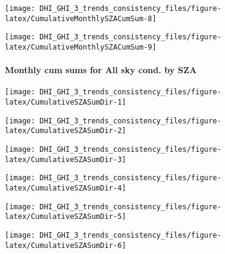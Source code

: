 \documentclass[
  10pt,
  a4paper,oneside]{article}
\begin{document}
\begin{center}\texttt{[image: DHI\_GHI\_3\_trends\_consistency\_files/figure-latex/CumulativeMonthlySZACumSum-8]} \end{center}

\begin{center}\texttt{[image: DHI\_GHI\_3\_trends\_consistency\_files/figure-latex/CumulativeMonthlySZACumSum-9]} \end{center}

\newpage

\FloatBarrier

\hypertarget{monthly-cum-sums-for-all-sky-cond.-by-sza-1}{%
\paragraph{Monthly cum sums for All sky cond. by SZA}\label{monthly-cum-sums-for-all-sky-cond.-by-sza-1}}

\begin{center}\texttt{[image: DHI\_GHI\_3\_trends\_consistency\_files/figure-latex/CumulativeSZASumDir-1]} \end{center}

\begin{center}\texttt{[image: DHI\_GHI\_3\_trends\_consistency\_files/figure-latex/CumulativeSZASumDir-2]} \end{center}

\begin{center}\texttt{[image: DHI\_GHI\_3\_trends\_consistency\_files/figure-latex/CumulativeSZASumDir-3]} \end{center}

\begin{center}\texttt{[image: DHI\_GHI\_3\_trends\_consistency\_files/figure-latex/CumulativeSZASumDir-4]} \end{center}

\begin{center}\texttt{[image: DHI\_GHI\_3\_trends\_consistency\_files/figure-latex/CumulativeSZASumDir-5]} \end{center}

\begin{center}\texttt{[image: DHI\_GHI\_3\_trends\_consistency\_files/figure-latex/CumulativeSZASumDir-6]} \end{center}

\newpage

\FloatBarrier
\end{document}
